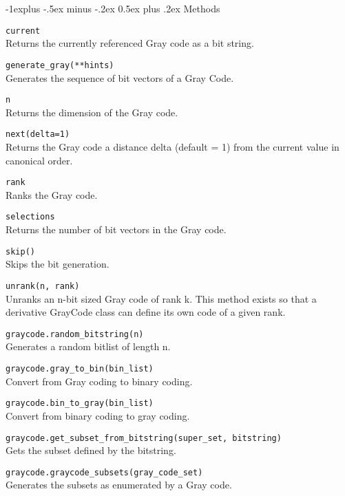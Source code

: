 \documentclass[10pt,landscape]{article}
\makeatletter
\renewcommand{\subsection}{\@startsection{subsection}{2}{0mm}%
                                {-1explus -.5ex minus -.2ex}%
                                {0.5ex plus .2ex}%
                                {\normalfont\normalsize\bfseries}}
\makeatother
\begin{document}
\begin{multicols}{3}
\subsection{Methods}

\verb!current!\\
Returns the currently referenced Gray code as a bit string.


\verb!generate_gray(**hints)!\\
Generates the sequence of bit vectors of a Gray Code.



\verb!n!\\
Returns the dimension of the Gray code.


\verb!next(delta=1)!\\
Returns the Gray code a distance delta (default = 1) from the current value in canonical order.



\verb!rank!\\
Ranks the Gray code.



\verb!selections!\\
Returns the number of bit vectors in the Gray code.



\verb!skip()!\\
Skips the bit generation.


\verb!unrank(n, rank)!\\
Unranks an n-bit sized Gray code of rank k.
This method exists so that a derivative GrayCode class can define its own code of a given rank.


\verb!graycode.random_bitstring(n)!\\
Generates a random bitlist of length n.


\verb!graycode.gray_to_bin(bin_list)!\\
Convert from Gray coding to binary coding.


\verb!graycode.bin_to_gray(bin_list)!\\
Convert from binary coding to gray coding.



\verb!graycode.get_subset_from_bitstring(super_set, bitstring)!\\
Gets the subset defined by the bitstring.



\verb!graycode.graycode_subsets(gray_code_set)!\\
Generates the subsets as enumerated by a Gray code.




\end{multicols}
\end{document}
